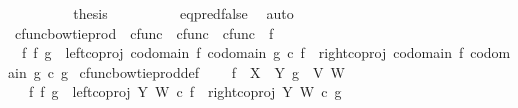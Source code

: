 \begin{isabellebody}
\ \ \ \ \ \ \isamarkupfalse%
\ \isamarkupfalse%
\ {\isacharquery}{\kern0pt}thesis\isanewline
\ \ \ \ \ \ \ \ \isamarkupfalse%
\ eq{\isacharunderscore}{\kern0pt}pred{\isacharunderscore}{\kern0pt}false\ \isamarkupfalse%
\ auto\isanewline
\ \ \ \ \isamarkupfalse%
\isanewline
\ \ \isamarkupfalse%
\isanewline
{}\isamarkupfalse%
%
\endisatagproof
{\isafoldproof}%
%
\isadelimproof
%
\endisadelimproof
%
\isadelimdocument
%
\endisadelimdocument
%
\isatagdocument
%
\isamarkuptrue%
%
\endisatagdocument
{\isafolddocument}%
%
\isadelimdocument
%
\endisadelimdocument
{}\isamarkupfalse%
\ cfunc{\isacharunderscore}{\kern0pt}bowtie{\isacharunderscore}{\kern0pt}prod\ {\isacharcolon}{\kern0pt}{\isacharcolon}{\kern0pt}\ {\isachardoublequoteopen}cfunc\ {\isasymRightarrow}\ cfunc\ {\isasymRightarrow}\ cfunc{\isachardoublequoteclose}\ {\isacharparenleft}{\kern0pt}\ {\isachardoublequoteopen}{\isasymbowtie}\isactrlsub f{\isachardoublequoteclose}\ {}{}{\isacharparenright}{\kern0pt}\ \isanewline
\ \ {\isachardoublequoteopen}f\ {\isasymbowtie}\isactrlsub f\ g\ {\isacharequal}{\kern0pt}\ {\isacharparenleft}{\kern0pt}{\isacharparenleft}{\kern0pt}left{\isacharunderscore}{\kern0pt}coproj\ {\isacharparenleft}{\kern0pt}codomain\ f{\isacharparenright}{\kern0pt}\ {\isacharparenleft}{\kern0pt}codomain\ g{\isacharparenright}{\kern0pt}{\isacharparenright}{\kern0pt}\ {\isasymcirc}\isactrlsub c\ f{\isacharparenright}{\kern0pt}\ {\isasymamalg}\ {\isacharparenleft}{\kern0pt}{\isacharparenleft}{\kern0pt}right{\isacharunderscore}{\kern0pt}coproj\ {\isacharparenleft}{\kern0pt}codomain\ f{\isacharparenright}{\kern0pt}\ {\isacharparenleft}{\kern0pt}codomain\ g{\isacharparenright}{\kern0pt}{\isacharparenright}{\kern0pt}\ {\isasymcirc}\isactrlsub c\ g{\isacharparenright}{\kern0pt}{\isachardoublequoteclose}\isanewline
\isanewline
{}\isamarkupfalse%
\ cfunc{\isacharunderscore}{\kern0pt}bowtie{\isacharunderscore}{\kern0pt}prod{\isacharunderscore}{\kern0pt}def{}{\isacharcolon}{\kern0pt}\ \isanewline
\ \ \ {\isachardoublequoteopen}f\ {\isacharcolon}{\kern0pt}\ X\ {\isasymrightarrow}\ Y{\isachardoublequoteclose}\ {\isachardoublequoteopen}g\ {\isacharcolon}{\kern0pt}\ V{\isasymrightarrow}\ W{\isachardoublequoteclose}\isanewline
\ \ \ {\isachardoublequoteopen}f\ {\isasymbowtie}\isactrlsub f\ g\ {\isacharequal}{\kern0pt}\ {\isacharparenleft}{\kern0pt}left{\isacharunderscore}{\kern0pt}coproj\ Y\ W\ {\isasymcirc}\isactrlsub c\ f{\isacharparenright}{\kern0pt}\ {\isasymamalg}\ {\isacharparenleft}{\kern0pt}right{\isacharunderscore}{\kern0pt}coproj\ Y\ W\ {\isasymcirc}\isactrlsub c\ g{\isacharparenright}{\kern0pt}{\isachardoublequoteclose}\isanewline

\end{isabellebody}
